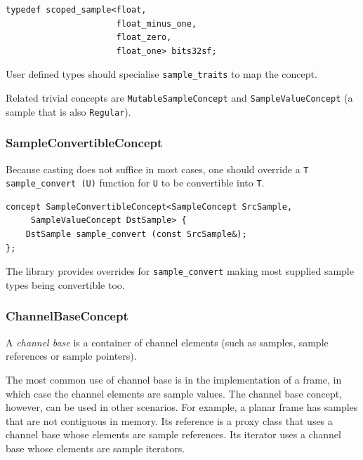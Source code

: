 \begin{lstlisting}
typedef scoped_sample<float,
                      float_minus_one,
                      float_zero,
                      float_one> bits32sf;
\end{lstlisting}

User defined types should specialise \texttt{sample\-\_traits} to map
the concept.

Related trivial concepts are \texttt{MutableSampleConcept} and
\texttt{SampleValueConcept} (a sample that is also \texttt{Regular}).

\subsubsection{{SampleConvertibleConcept}}

Because casting does not suffice in most cases, one should
override a \texttt{T sample\_convert (U)} function for \texttt{U} to
be convertible into \texttt{T}.

\begin{lstlisting}
concept SampleConvertibleConcept<SampleConcept SrcSample,
     SampleValueConcept DstSample> {
    DstSample sample_convert (const SrcSample&);
};
\end{lstlisting}

The library provides overrides for \texttt{sample\_convert} making
most supplied sample types being convertible too.

\subsubsection{{ChannelBaseConcept}}

A \emph{channel base} is a container of channel elements (such as
samples, sample references or sample pointers).

The most common use of channel base is in the implementation of a
frame, in which case the channel elements are sample values. The
channel base concept, however, can be used in other scenarios. For
example, a planar frame has samples that are not contiguous in
memory. Its reference is a proxy class that uses a channel base whose
elements are sample references. Its iterator uses a channel base whose
elements are sample iterators.

